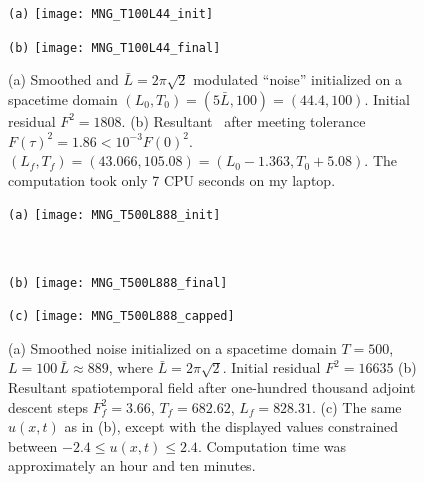 \begin{figure}[ht]
\begin{minipage}[height=.32\textheight]{.45\textwidth}
\centering \small{\texttt{(a)}}
\texttt{[image: MNG\_T100L44\_init]}
\end{minipage}
\begin{minipage}[height=.32\textheight]{.45\textwidth}
\centering \small{\texttt{(b)}}
\texttt{[image: MNG\_T100L44\_final]}
\end{minipage}
\caption{ \label{fig:MNG_spacetime_smoothed}
(a) Smoothed and $\bar{L}=2\pi\sqrt{2}$ modulated ``noise''
initialized on a spacetime domain
$(L_0,T_0)=(5\bar{L},100)=(44.4,100)$. Initial residual $F^2 = 1808$.
(b) Resultant \twot\ after meeting tolerance
$F(\tau)^2= 1.86<10^{-3} F(0)^2$.
$(L_f,T_f)=(43.066,105.08) = (L_0 - 1.363,T_0 + 5.08)$.
The computation took only 7 CPU seconds on my laptop.
}
\end{figure}

\begin{figure}
\begin{minipage}[height=.32\textheight]{.45\textwidth}
\centering \small{\texttt{(a)}}
\texttt{[image: MNG\_T500L888\_init]}
\end{minipage}
\\
\begin{minipage}[height=.32\textheight]{.45\textwidth}
\centering \small{\texttt{(b)}}
\texttt{[image: MNG\_T500L888\_final]}
\end{minipage}
\begin{minipage}[height=.32\textheight]{.45\textwidth}
\centering \small{\texttt{(c)}}
\texttt{[image: MNG\_T500L888\_capped]}
\end{minipage}
\caption{ \label{fig:MNG_spacetime_capped}
(a) Smoothed noise initialized on a spacetime domain $T=500$,
$L=100\,\bar{L} \approx 889$, where $\bar{L}=2\pi\sqrt{2}$.
Initial residual $F^2 = 16635$
(b) Resultant spatiotemporal field after one-hundred thousand adjoint descent
steps $F^2_f = 3.66$, $T_f = 682.62$, $L_f=828.31$.
(c) The same $u(x,t)$ as in (b), except with the displayed values constrained
between $-2.4 \leq u(x,t) \leq 2.4$. Computation time was approximately an hour
and ten minutes.
}
\end{figure}


